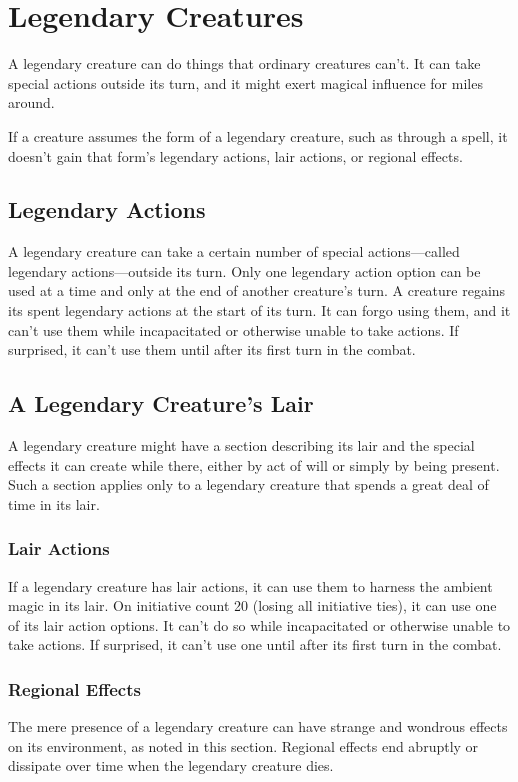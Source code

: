 \documentclass[
]{article}
\date{}
\begin{document}
\hypertarget{legendary-creatures}{%
\section{Legendary Creatures}\label{legendary-creatures}}

A legendary creature can do things that ordinary creatures can't. It can
take special actions outside its turn, and it might exert magical
influence for miles around.

If a creature assumes the form of a legendary creature, such as through
a spell, it doesn't gain that form's legendary actions, lair actions, or
regional effects.

\hypertarget{legendary-actions}{%
\subsection{Legendary Actions}\label{legendary-actions}}

A legendary creature can take a certain number of special
actions---called legendary actions---outside its turn. Only one
legendary action option can be used at a time and only at the end of
another creature's turn. A creature regains its spent legendary actions
at the start of its turn. It can forgo using them, and it can't use them
while incapacitated or otherwise unable to take actions. If surprised,
it can't use them until after its first turn in the combat.

\hypertarget{a-legendary-creatures-lair}{%
\subsection{A Legendary Creature's
Lair}\label{a-legendary-creatures-lair}}

A legendary creature might have a section describing its lair and the
special effects it can create while there, either by act of will or
simply by being present. Such a section applies only to a legendary
creature that spends a great deal of time in its lair.

\hypertarget{lair-actions}{%
\subsubsection{Lair Actions}\label{lair-actions}}

If a legendary creature has lair actions, it can use them to harness the
ambient magic in its lair. On initiative count 20 (losing all initiative
ties), it can use one of its lair action options. It can't do so while
incapacitated or otherwise unable to take actions. If surprised, it
can't use one until after its first turn in the combat.

\hypertarget{regional-effects}{%
\subsubsection{Regional Effects}\label{regional-effects}}

The mere presence of a legendary creature can have strange and wondrous
effects on its environment, as noted in this section. Regional effects
end abruptly or dissipate over time when the legendary creature dies.
\end{document}
